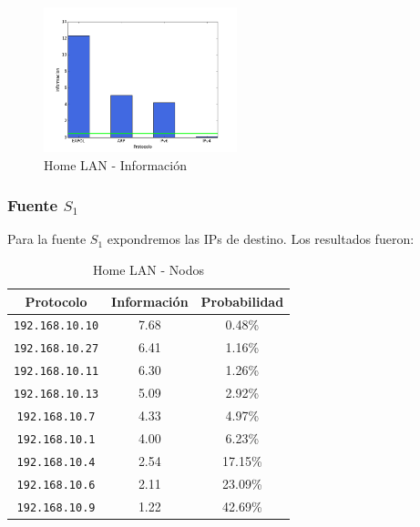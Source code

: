 \documentclass[final,inline,narroweqnarray,a4paper]{ieee}
\begin{document}
\begin{figure}[H]
    \begin{center}
        \includegraphics[width=0.5\textwidth]{plot/homelanS-bar.png}
        \caption{Home LAN - Información}
        \label{histo:homelanS}
    \end{center}
\end{figure}

\subsubsection{Fuente $S_1$}
Para la fuente $S_1$ expondremos las IPs de destino. Los resultados fueron:

\begin{table}[H]
    \begin{center}
        \begin{tabular}{|c|c|c|}
            \hline
            \textbf{Protocolo} & \textbf{Información} & \textbf{Probabilidad} \\ \hline
            \texttt{192.168.10.10}&7.68        & 0.48\%     \\ \hline
            \texttt{192.168.10.27}&6.41        & 1.16\%     \\ \hline
            \texttt{192.168.10.11}&6.30        & 1.26\%     \\ \hline
            \texttt{192.168.10.13}&5.09        & 2.92\%     \\ \hline
            \texttt{192.168.10.7}&4.33         & 4.97\%     \\ \hline
            \texttt{192.168.10.1}&4.00         & 6.23\%     \\ \hline
            \texttt{192.168.10.4}&2.54         & 17.15\%    \\ \hline
            \texttt{192.168.10.6}&2.11         & 23.09\%    \\ \hline
            \texttt{192.168.10.9}&1.22         & 42.69\%    \\ \hline
        \end{tabular}
        \caption{Home LAN - Nodos}
        \label{table:homelanS1}
    \end{center}
\end{table}
\end{document}
